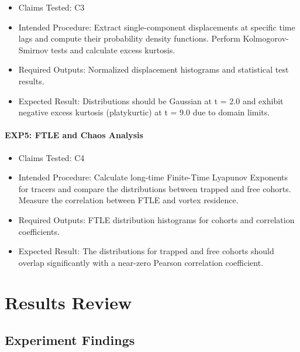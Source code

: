 \documentclass[11pt]{article}
\begin{document}
\begin{itemize}

\item Claims Tested: C3

\item Intended Procedure: Extract single-component displacements at specific time lags and compute their probability density functions. Perform Kolmogorov-Smirnov tests and calculate excess kurtosis.

\item Required Outputs: Normalized displacement histograms and statistical test results.

\item Expected Result: Distributions should be Gaussian at t = 2.0 and exhibit negative excess kurtosis (platykurtic) at t = 9.0 due to domain limits.

\end{itemize}

\paragraph{EXP5: FTLE and Chaos Analysis}

\begin{itemize}

\item Claims Tested: C4

\item Intended Procedure: Calculate long-time Finite-Time Lyapunov Exponents for tracers and compare the distributions between trapped and free cohorts. Measure the correlation between FTLE and vortex residence.

\item Required Outputs: FTLE distribution histograms for cohorts and correlation coefficients.

\item Expected Result: The distributions for trapped and free cohorts should overlap significantly with a near-zero Pearson correlation coefficient.

\end{itemize}

\section*{Results Review}

\subsection*{Experiment Findings}
\end{document}
